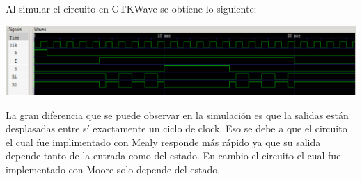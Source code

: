 Al simular el circuito en GTKWave se obtiene lo siguiente:
\begin{center}
\includegraphics[scale=0.5]{../Ejercicio-1/mealy2.png}
\end{center}
La gran diferencia que se puede observar en la simulación es que la salidas est\'an desplasadas entre s\'i exactamente un ciclo de clock. Eso se debe a que el circuito el cual fue implimentado con Mealy responde m\'as r\'apido ya que su salida depende tanto de la entrada como del estado. En cambio el circuito el cual fue implementado con Moore solo depende del estado.